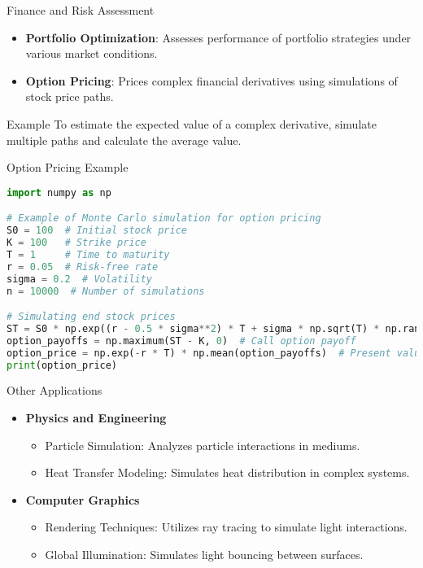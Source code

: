 \documentclass[aspectratio=169]{beamer}
\begin{document}
\begin{frame}{Finance and Risk Assessment}
    \begin{itemize}
        \item \textbf{Portfolio Optimization}: Assesses performance of portfolio strategies under various market conditions.
        \item \textbf{Option Pricing}: Prices complex financial derivatives using simulations of stock price paths.
    \end{itemize}
    \begin{block}{Example}
        To estimate the expected value of a complex derivative, simulate multiple paths and calculate the average value.
    \end{block}
\end{frame}

\begin{frame}[fragile]{Option Pricing Example}
    \begin{lstlisting}[language=Python]
import numpy as np

# Example of Monte Carlo simulation for option pricing
S0 = 100  # Initial stock price
K = 100   # Strike price
T = 1     # Time to maturity
r = 0.05  # Risk-free rate
sigma = 0.2  # Volatility
n = 10000  # Number of simulations

# Simulating end stock prices
ST = S0 * np.exp((r - 0.5 * sigma**2) * T + sigma * np.sqrt(T) * np.random.normal(0, 1, n))
option_payoffs = np.maximum(ST - K, 0)  # Call option payoff
option_price = np.exp(-r * T) * np.mean(option_payoffs)  # Present value of expected payoff
print(option_price)
    \end{lstlisting}
\end{frame}

\begin{frame}{Other Applications}
    \begin{itemize}
        \item \textbf{Physics and Engineering}
            \begin{itemize}
                \item Particle Simulation: Analyzes particle interactions in mediums.
                \item Heat Transfer Modeling: Simulates heat distribution in complex systems.
            \end{itemize}
        \item \textbf{Computer Graphics}
            \begin{itemize}
                \item Rendering Techniques: Utilizes ray tracing to simulate light interactions.
                \item Global Illumination: Simulates light bouncing between surfaces.
            \end{itemize}
    \end{itemize}
\end{frame}
\end{document}
